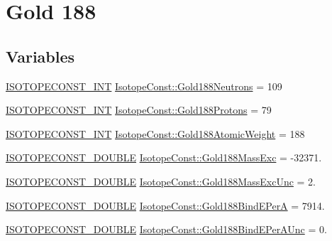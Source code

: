 \hypertarget{group___isotope_const-_gold-_au188}{}\section{Gold 188}
\label{group___isotope_const-_gold-_au188}
\subsection*{Variables}
\begin{DoxyCompactItemize}
\item 
\mbox{\hyperlink{group___isotope_const-_macros_ga5f18360b3e99483a35c32d789e62621c}{I\+S\+O\+T\+O\+P\+E\+C\+O\+N\+S\+T\+\_\+\+I\+NT}} \mbox{\hyperlink{group___isotope_const-_gold-_au188_ga61dbdfc64d4911c0bec4f69177a85f40}{Isotope\+Const\+::\+Gold188\+Neutrons}} = 109
\item 
\mbox{\hyperlink{group___isotope_const-_macros_ga5f18360b3e99483a35c32d789e62621c}{I\+S\+O\+T\+O\+P\+E\+C\+O\+N\+S\+T\+\_\+\+I\+NT}} \mbox{\hyperlink{group___isotope_const-_gold-_au188_ga6a1aff379a38793dacf7e768268dc685}{Isotope\+Const\+::\+Gold188\+Protons}} = 79
\item 
\mbox{\hyperlink{group___isotope_const-_macros_ga5f18360b3e99483a35c32d789e62621c}{I\+S\+O\+T\+O\+P\+E\+C\+O\+N\+S\+T\+\_\+\+I\+NT}} \mbox{\hyperlink{group___isotope_const-_gold-_au188_gad24d81e19e62a804e068cff79e37937b}{Isotope\+Const\+::\+Gold188\+Atomic\+Weight}} = 188
\item 
\mbox{\hyperlink{group___isotope_const-_macros_ga8f45a7272ce02c0b4c65c44636ed719a}{I\+S\+O\+T\+O\+P\+E\+C\+O\+N\+S\+T\+\_\+\+D\+O\+U\+B\+LE}} \mbox{\hyperlink{group___isotope_const-_gold-_au188_gaa90a5b6811c1ea1c42261daa9d210db9}{Isotope\+Const\+::\+Gold188\+Mass\+Exc}} = -\/32371.
\item 
\mbox{\hyperlink{group___isotope_const-_macros_ga8f45a7272ce02c0b4c65c44636ed719a}{I\+S\+O\+T\+O\+P\+E\+C\+O\+N\+S\+T\+\_\+\+D\+O\+U\+B\+LE}} \mbox{\hyperlink{group___isotope_const-_gold-_au188_ga77219667c9a7932dea1cd3395b4bdf3b}{Isotope\+Const\+::\+Gold188\+Mass\+Exc\+Unc}} = 2.
\item 
\mbox{\hyperlink{group___isotope_const-_macros_ga8f45a7272ce02c0b4c65c44636ed719a}{I\+S\+O\+T\+O\+P\+E\+C\+O\+N\+S\+T\+\_\+\+D\+O\+U\+B\+LE}} \mbox{\hyperlink{group___isotope_const-_gold-_au188_gad25e1d1503c2e129b3dccd67dfe5a4f9}{Isotope\+Const\+::\+Gold188\+Bind\+E\+PerA}} = 7914.
\item 
\mbox{\hyperlink{group___isotope_const-_macros_ga8f45a7272ce02c0b4c65c44636ed719a}{I\+S\+O\+T\+O\+P\+E\+C\+O\+N\+S\+T\+\_\+\+D\+O\+U\+B\+LE}} \mbox{\hyperlink{group___isotope_const-_gold-_au188_gac59e7bfed68b283c75ffcdff3be3a82c}{Isotope\+Const\+::\+Gold188\+Bind\+E\+Per\+A\+Unc}} = 0.

\end{DoxyCompactItemize}
